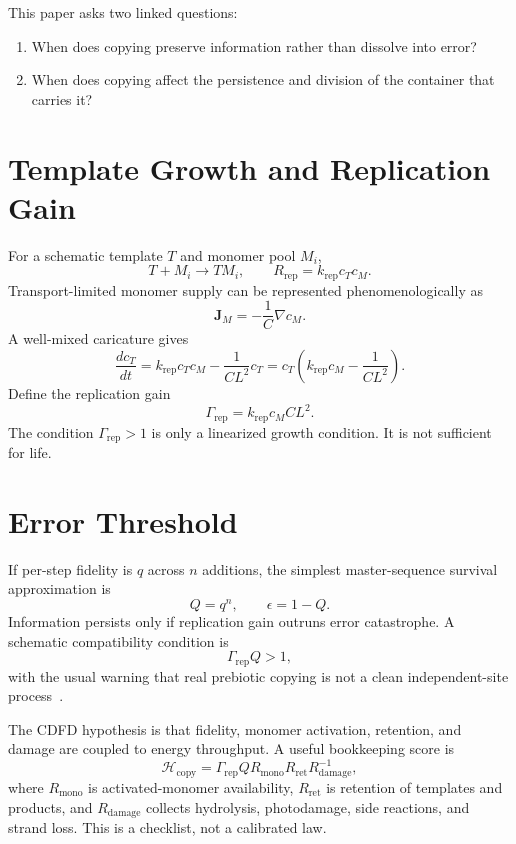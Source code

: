 \documentclass[11pt,a4paper]{article}
\begin{document}
This paper asks two linked questions:
\begin{enumerate}
 \item When does copying preserve information rather than dissolve into error?
 \item When does copying affect the persistence and division of the container that carries it?
\end{enumerate}

\section{Template Growth and Replication Gain}
For a schematic template $T$ and monomer pool $M_i$,
\begin{equation}
 T+M_i\rightarrow TM_i,
 \qquad
 R_{\mathrm{rep}}=k_{\mathrm{rep}}c_Tc_M.
\end{equation}
Transport-limited monomer supply can be represented phenomenologically as
\begin{equation}
 \bm{J}_M=-\frac{1}{C}\nabla c_M.
\end{equation}
A well-mixed caricature gives
\begin{equation}
\frac{dc_T}{dt}
=
k_{\mathrm{rep}}c_Tc_M-\frac{1}{CL^2}c_T
=
c_T\left(k_{\mathrm{rep}}c_M-\frac{1}{CL^2}\right).
\end{equation}
Define the replication gain
\begin{equation}
 \Gamma_{\mathrm{rep}}=k_{\mathrm{rep}}c_MCL^2.
\end{equation}
The condition $\Gamma_{\mathrm{rep}}>1$ is only a linearized growth condition. It is not sufficient for life.

\section{Error Threshold}
If per-step fidelity is $q$ across $n$ additions, the simplest master-sequence survival approximation is
\begin{equation}
 Q=q^n,\qquad \epsilon=1-Q.
\end{equation}
Information persists only if replication gain outruns error catastrophe. A schematic compatibility condition is
\begin{equation}
 \Gamma_{\mathrm{rep}}Q>1,
 \label{eq:error-threshold}
\end{equation}
with the usual warning that real prebiotic copying is not a clean independent-site process~\cite{Orgel1963,Eigen1971}.

The CDFD hypothesis is that fidelity, monomer activation, retention, and damage are coupled to energy throughput. A useful bookkeeping score is
\begin{equation}
\mathcal{H}_{\mathrm{copy}}
=
\Gamma_{\mathrm{rep}}Q
R_{\mathrm{mono}}
R_{\mathrm{ret}}
R_{\mathrm{damage}}^{-1},
\end{equation}
where $R_{\mathrm{mono}}$ is activated-monomer availability, $R_{\mathrm{ret}}$ is retention of templates and products, and $R_{\mathrm{damage}}$ collects hydrolysis, photodamage, side reactions, and strand loss. This is a checklist, not a calibrated law.
\end{document}
